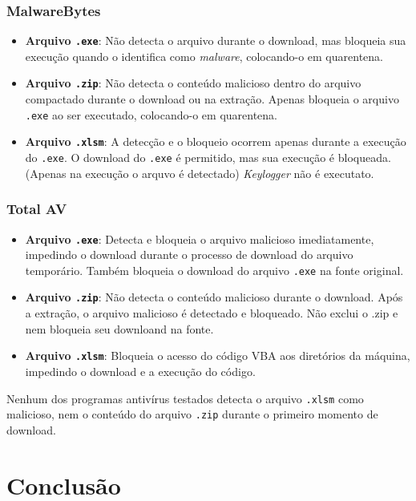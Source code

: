 \documentclass[12pt]{article}
\begin{document}
\subsubsection*{MalwareBytes}
\begin{itemize}
    \item \textbf{Arquivo \texttt{.exe}}: Não detecta o arquivo durante o download, mas bloqueia sua execução quando o identifica como \textit{malware}, colocando-o em quarentena.
    \item \textbf{Arquivo \texttt{.zip}}: Não detecta o conteúdo malicioso dentro do arquivo compactado durante o download ou na extração. Apenas bloqueia o arquivo \texttt{.exe} ao ser executado, colocando-o em quarentena.
    \item \textbf{Arquivo \texttt{.xlsm}}: A detecção e o bloqueio ocorrem apenas durante a execução do \texttt{.exe}. O download do \texttt{.exe} é permitido, mas sua execução é bloqueada. (Apenas na execução o arquvo é detectado) \textit{Keylogger} não é executato.
\end{itemize}

\subsubsection*{Total AV}
\begin{itemize}
    \item \textbf{Arquivo \texttt{.exe}}: Detecta e bloqueia o arquivo malicioso imediatamente, impedindo o download durante o processo de download do arquivo temporário. Também bloqueia o download do arquivo \texttt{.exe} na fonte original.
    \item \textbf{Arquivo \texttt{.zip}}: Não detecta o conteúdo malicioso durante o download. Após a extração, o arquivo malicioso é detectado e bloqueado. Não exclui o .zip e nem bloqueia seu downloand na fonte.
    \item \textbf{Arquivo \texttt{.xlsm}}: Bloqueia o acesso do código VBA aos diretórios da máquina, impedindo o download e a execução do código.
\end{itemize}

Nenhum dos programas antivírus testados detecta o arquivo \texttt{.xlsm} como malicioso, nem o conteúdo do arquivo \texttt{.zip} durante o primeiro momento de download.

\section{Conclusão}
\end{document}
